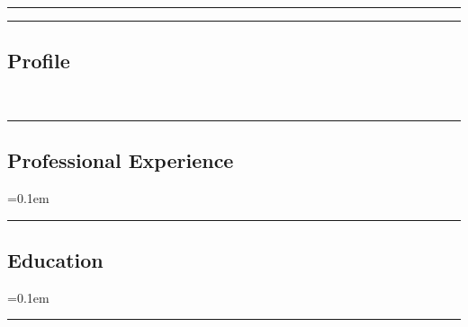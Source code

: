 





\hrule
\begin{indentsection}{\parindent}
\begin{description*}
  
  
\end{description*}
\end{indentsection}

\hrule
\vspace{-0.4em}
\subsection*{Profile}
\

\hrule
\vspace{-0.4em}
\subsection*{Professional Experience}
\begin{itemize}
  \parskip=0.1em
  
  
  
\end{itemize}

\hrule
\vspace{-0.4em}
\subsection*{Education}
\begin{itemize}
  \parskip=0.1em

  
\end{itemize}
\hrule

\vspace*{\fill}



